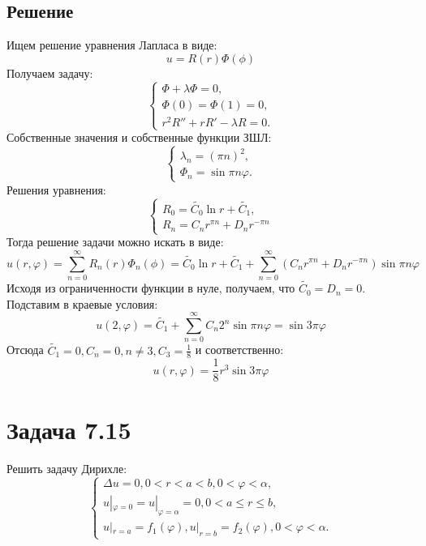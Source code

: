 \documentclass[11pt]{article}
\begin{document}
\subsection{Решение}
\label{sec:orgdf5ecab}
Ищем решение уравнения Лапласа в виде:
\begin{equation*}
u = R(r)\Phi(\phi)
\end{equation*}
Получаем задачу:
\begin{equation*}
\begin{cases}
\Phi + \lambda\Phi = 0, \\
\Phi(0) = \Phi(1) = 0, \\
r^2R'' + rR' - \lambda R = 0.
\end{cases}
\end{equation*}
Собственные значения и собственные функции ЗШЛ:
\begin{equation*}
\begin{cases}
\lambda_n = (\pi n)^2, \\
\Phi_n = \sin\pi n\varphi.
\end{cases}
\end{equation*}
Решения уравнения:
\begin{equation*}
\begin{cases}
R_0 = \tilde{C_0}\ln r + \tilde{C_1}, \\
R_n = C_nr^{\pi n} + D_nr^{-\pi n}
\end{cases}
\end{equation*}
Тогда решение задачи можно искать в виде:
\begin{equation*}
u(r, \varphi) = \sum_{n = 0}^{\infty}R_n(r)\Phi_n(\phi) = \tilde{C_0}\ln r + \tilde{C_1} +
\sum_{n = 0}^{\infty}(C_nr^{\pi n} + D_nr^{-\pi n})\sin\pi n\varphi
\end{equation*}
Исходя из ограниченности функции в нуле, получаем, что $\tilde{C_0} = D_n = 0$. Подставим в
краевые условия:
\begin{equation*}
u(2, \varphi) = \tilde{C_1} + \sum_{n = 0}^{\infty}C_n2^n\sin\pi n\varphi = \sin3\pi\varphi
\end{equation*}
Отсюда $\tilde{C_1} = 0, C_n = 0, n \neq 3, C_3 = \frac18$ и соответственно:
\begin{equation}
u(r, \varphi) = \frac18r^3\sin3\pi\varphi
\end{equation}
\section{Задача 7.15}
\label{sec:orgc5f1dfb}
Решить задачу Дирихле:
\begin{equation}
\begin{cases}
\Delta u = 0, 0 < r < a < b, 0 < \varphi < \alpha, \\
u|_{\varphi = 0} = u|_{\varphi = \alpha} = 0, 0 < a \leq r \leq b, \\
u|_{r = a} = f_1(\varphi), u|_{r = b} = f_2(\varphi), 0 < \varphi < \alpha.
\end{cases}
\end{equation}
\end{document}
